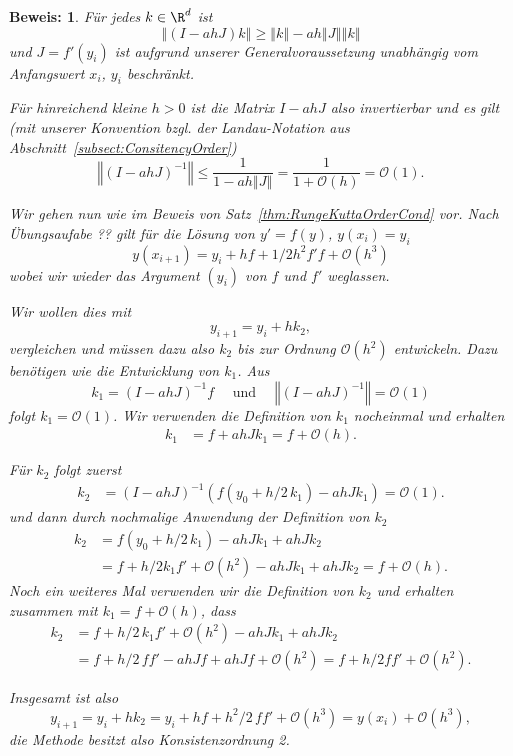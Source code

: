 \documentclass[
]{mycourse}
\theoremstyle{mythm}
\theoremstyle{break}
\newtheorem*{beweis}{Beweis:}
\newcommand{\norm}[1]{\left\Vert#1\right\Vert}		%
\begin{document}
\begin{beweis}
Für jedes $k\in \R^d$ ist 
\[
\norm{(I-ahJ)k}\geq \norm{k}-ah\norm{J}\norm{k}
\]
und $J=f'(y_i)$ ist aufgrund unserer Generalvoraussetzung unabhängig vom Anfangswert $x_i$, $y_i$ beschränkt.

Für hinreichend kleine $h>0$ ist die Matrix $I-ahJ$ also invertierbar und es gilt (mit unserer Konvention bzgl. der Landau-Notation aus Abschnitt~\ref{subsect:ConsitencyOrder})
\[
\norm{(I-ahJ)^{-1}}\leq \frac{1}{1-ah\norm{J}}=\frac{1}{1+\mathcal{O}(h)}=\mathcal{O}(1).
\]

Wir gehen nun wie im Beweis von Satz~\ref{thm:RungeKuttaOrderCond} vor. Nach Übungsaufabe ?? gilt 
für die Lösung von $y'=f(y)$, $y(x_i)=y_i$ 
\[
y(x_{i+1})=y_i+h f+1/2 h^2 f' f + \mathcal{O}(h^3)
\]
wobei wir wieder das Argument $(y_i)$ von $f$ und $f'$ weglassen.

Wir wollen dies mit 
\[
y_{i+1}=y_i+hk_2,
\]
vergleichen und müssen dazu also $k_2$ bis zur Ordnung $\mathcal{O}(h^2)$ entwickeln. Dazu benötigen wie die Entwicklung von $k_1$.
Aus 
\[
k_1=(I-ahJ)^{-1} f\quad \mbox{ und } \quad \norm{(I-ahJ)^{-1}}=\mathcal{O}(1)
\]
folgt $k_1=\mathcal{O}(1)$. Wir verwenden die Definition von $k_1$ nocheinmal und erhalten 
\begin{align*}
k_1&=f + ahJ k_1=f+\mathcal{O}(h).        %
\end{align*}

Für $k_2$ folgt zuerst
\begin{align*}
k_2&= (I-ahJ)^{-1} \left(f(y_0+ h/2\, k_1) - ahJk_1 \right)=\mathcal{O}(1).
\end{align*}
und dann durch nochmalige Anwendung der Definition von $k_2$
\begin{align*}
k_2&=f(y_0+ h/2\, k_1) - ahJk_1 + ahJ k_2\\
&=  f + h/2 k_1 f' +\mathcal{O}(h^2) - ahJ k_1 + ahJ k_2= f + \mathcal{O}(h).
\end{align*}
Noch ein weiteres Mal verwenden wir die Definition von $k_2$ und erhalten zusammen mit $k_1=f+\mathcal{O}(h)$, dass
\begin{align*}
k_2&=  f + h/2\, k_1 f' +\mathcal{O}(h^2) - ahJ k_1 + ahJ k_2\\
&= f+ h/2\, f f' - ahJ f + ahJ f  +\mathcal{O}(h^2)= f+ h/2 f f' +\mathcal{O}(h^2).
\end{align*}

Insgesamt ist also
\[
y_{i+1}=y_i+hk_2=y_i+hf+h^2/2\, f f' + \mathcal{O}(h^3)=y(x_i)+\mathcal{O}(h^3),
\]
die Methode besitzt also Konsistenzordnung 2. 
\end{beweis}
\end{document}
